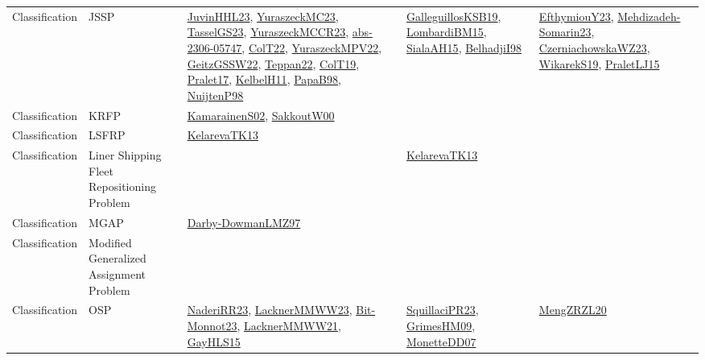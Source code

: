 {\begin{longtable}{lp{3cm}>{\raggedright}p{6cm}>{\raggedright}p{6cm}p{8cm}}
Classification & JSSP & \href{papers/JuvinHHL23.pdf}{JuvinHHL23}\cite{JuvinHHL23}, \href{papers/YuraszeckMC23.pdf}{YuraszeckMC23}\cite{YuraszeckMC23}, \href{papers/TasselGS23.pdf}{TasselGS23}\cite{TasselGS23}, \href{articles/YuraszeckMCCR23.pdf}{YuraszeckMCCR23}\cite{YuraszeckMCCR23}, \href{articles/abs-2306-05747.pdf}{abs-2306-05747}\cite{abs-2306-05747}, \href{articles/ColT22.pdf}{ColT22}\cite{ColT22}, \href{articles/YuraszeckMPV22.pdf}{YuraszeckMPV22}\cite{YuraszeckMPV22}, \href{papers/GeitzGSSW22.pdf}{GeitzGSSW22}\cite{GeitzGSSW22}, \href{papers/Teppan22.pdf}{Teppan22}\cite{Teppan22}, \href{papers/ColT19.pdf}{ColT19}\cite{ColT19}, \href{papers/Pralet17.pdf}{Pralet17}\cite{Pralet17}, \href{articles/KelbelH11.pdf}{KelbelH11}\cite{KelbelH11}, \href{articles/PapaB98.pdf}{PapaB98}\cite{PapaB98}, \href{articles/NuijtenP98.pdf}{NuijtenP98}\cite{NuijtenP98} & \href{papers/GalleguillosKSB19.pdf}{GalleguillosKSB19}\cite{GalleguillosKSB19}, \href{papers/LombardiBM15.pdf}{LombardiBM15}\cite{LombardiBM15}, \href{papers/SialaAH15.pdf}{SialaAH15}\cite{SialaAH15}, \href{articles/BelhadjiI98.pdf}{BelhadjiI98}\cite{BelhadjiI98} & \href{papers/EfthymiouY23.pdf}{EfthymiouY23}\cite{EfthymiouY23}, \href{papers/Mehdizadeh-Somarin23.pdf}{Mehdizadeh-Somarin23}\cite{Mehdizadeh-Somarin23}, \href{articles/CzerniachowskaWZ23.pdf}{CzerniachowskaWZ23}\cite{CzerniachowskaWZ23}, \href{articles/WikarekS19.pdf}{WikarekS19}\cite{WikarekS19}, \href{papers/PraletLJ15.pdf}{PraletLJ15}\cite{PraletLJ15}\\
Classification & KRFP & \href{papers/KamarainenS02.pdf}{KamarainenS02}\cite{KamarainenS02}, \href{articles/SakkoutW00.pdf}{SakkoutW00}\cite{SakkoutW00} &  & \\
Classification & LSFRP & \href{papers/KelarevaTK13.pdf}{KelarevaTK13}\cite{KelarevaTK13} &  & \\
Classification & Liner Shipping Fleet Repositioning Problem &  & \href{papers/KelarevaTK13.pdf}{KelarevaTK13}\cite{KelarevaTK13} & \\
Classification & MGAP & \href{articles/Darby-DowmanLMZ97.pdf}{Darby-DowmanLMZ97}\cite{Darby-DowmanLMZ97} &  & \\
Classification & Modified Generalized Assignment Problem &  &  & \\
Classification & OSP & \href{articles/NaderiRR23.pdf}{NaderiRR23}\cite{NaderiRR23}, \href{articles/LacknerMMWW23.pdf}{LacknerMMWW23}\cite{LacknerMMWW23}, \href{papers/Bit-Monnot23.pdf}{Bit-Monnot23}\cite{Bit-Monnot23}, \href{papers/LacknerMMWW21.pdf}{LacknerMMWW21}\cite{LacknerMMWW21}, \href{papers/GayHLS15.pdf}{GayHLS15}\cite{GayHLS15} & \href{papers/SquillaciPR23.pdf}{SquillaciPR23}\cite{SquillaciPR23}, \href{papers/GrimesHM09.pdf}{GrimesHM09}\cite{GrimesHM09}, \href{papers/MonetteDD07.pdf}{MonetteDD07}\cite{MonetteDD07} & \href{articles/MengZRZL20.pdf}{MengZRZL20}\cite{MengZRZL20}\\

\end{longtable}}
